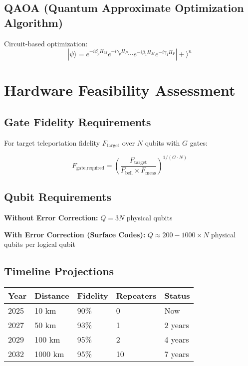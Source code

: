 \documentclass[11pt,a4paper]{article}
\begin{document}
\subsection{QAOA (Quantum Approximate Optimization Algorithm)}

Circuit-based optimization:
$$|\psi\rangle = e^{-i\beta_p H_M} e^{-i\gamma_p H_P} \cdots e^{-i\beta_1 H_M} e^{-i\gamma_1 H_P} |+\rangle^n$$

\section{Hardware Feasibility Assessment}

\subsection{Gate Fidelity Requirements}

For target teleportation fidelity $F_{\text{target}}$ over $N$ qubits with $G$ gates:

$$F_{\text{gate,required}} = \left(\frac{F_{\text{target}}}{F_{\text{bell}} \times F_{\text{meas}}}\right)^{1/(G \cdot N)}$$

\subsection{Qubit Requirements}

\textbf{Without Error Correction:} $Q = 3N$ physical qubits

\textbf{With Error Correction (Surface Codes):} $Q \approx 200-1000 \times N$ physical qubits per logical qubit

\subsection{Timeline Projections}

\begin{table}[h]
\centering
\begin{tabular}{lllll}
\toprule
\textbf{Year} & \textbf{Distance} & \textbf{Fidelity} & \textbf{Repeaters} & \textbf{Status} \\
\midrule
2025 & 10 km & 90\% & 0 & Now \\
2027 & 50 km & 93\% & 1 & 2 years \\
2029 & 100 km & 95\% & 2 & 4 years \\
2032 & 1000 km & 95\% & 10 & 7 years \\
\bottomrule
\end{tabular}
\end{table}
\end{document}
